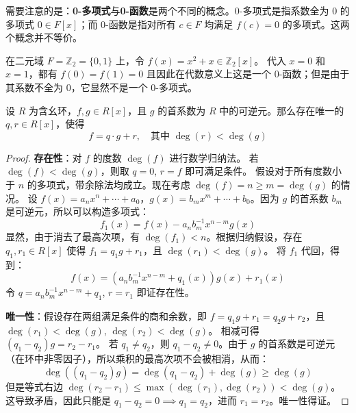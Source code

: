 \documentclass[11pt]{article}
\begin{document}
需要注意的是：\textbf{0-多项式}与\textbf{0-函数}是两个不同的概念。0-多项式是指系数全为 $0$ 的多项式 $0 \in F[x]$；而 0-函数是指对所有 $c \in F$ 均满足 $f(c) = 0$ 的多项式。这两个概念并不等价。
\begin{cnexample}
在二元域 $F = \mathbb{Z}_2 = \{0, 1\}$ 上，令 $f(x) = x^2 + x \in \mathbb{Z}_2[x]$。
代入 $x=0$ 和 $x=1$，都有 $f(0) = f(1) = 0$ 且因此在代数意义上这是一个 0-函数；但是由于其系数不全为 $0$，它显然不是一个 0-多项式。
\end{cnexample}

\begin{cntheorem}[多项式的带余除法]
设 $R$ 为含幺环，$f, g \in R[x]$，且 $g$ 的首系数为 $R$ 中的可逆元。那么存在唯一的 $q, r \in R[x]$，使得
$$ f = q \cdot g + r, \quad \text{其中 } \deg(r) < \deg(g) $$
\end{cntheorem}
\begin{proof}
\textbf{存在性}：对 $f$ 的度数 $\deg(f)$ 进行数学归纳法。
若 $\deg(f) < \deg(g)$，则取 $q=0$, $r=f$ 即可满足条件。
假设对于所有度数小于 $n$ 的多项式，带余除法均成立。现在考虑 $\deg(f) = n \ge m = \deg(g)$ 的情况。
设 $f(x) = a_n x^n + \cdots + a_0$，$g(x) = b_m x^m + \cdots + b_0$。因为 $g$ 的首系数 $b_m$ 是可逆元，所以可以构造多项式：
$$ f_1(x) = f(x) - a_n b_m^{-1} x^{n-m} g(x) $$
显然，由于消去了最高次项，有 $\deg(f_1) < n$。根据归纳假设，存在 $q_1, r_1 \in R[x]$ 使得 $f_1 = q_1 g + r_1$，且 $\deg(r_1) < \deg(g)$。
将 $f_1$ 代回，得到：
$$ f(x) = (a_n b_m^{-1} x^{n-m} + q_1(x)) g(x) + r_1(x) $$
令 $q = a_n b_m^{-1} x^{n-m} + q_1$, $r = r_1$ 即证存在性。

\textbf{唯一性}：假设存在两组满足条件的商和余数，即 $f = q_1 g + r_1 = q_2 g + r_2$，且 $\deg(r_1) < \deg(g)$, $\deg(r_2) < \deg(g)$。
相减可得 $(q_1 - q_2)g = r_2 - r_1$。
若 $q_1 \neq q_2$，则 $q_1 - q_2 \neq 0$。由于 $g$ 的首系数是可逆元（在环中非零因子），所以乘积的最高次项不会被相消，从而：
$$ \deg((q_1 - q_2)g) = \deg(q_1 - q_2) + \deg(g) \ge \deg(g) $$
但是等式右边 $\deg(r_2 - r_1) \le \max(\deg(r_1), \deg(r_2)) < \deg(g)$。
这导致矛盾，因此只能是 $q_1 - q_2 = 0 \implies q_1 = q_2$，进而 $r_1 = r_2$。唯一性得证。
\end{proof}
\end{document}
